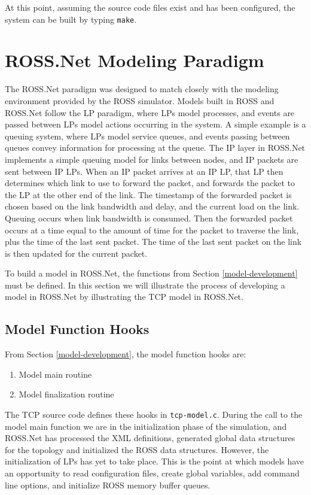 \documentclass[conference,onecolumn]{IEEEtran}
\begin{document}
At this point, assuming the source code files exist and has been configured, the system can be built by typing {\tt make}.

\section{ROSS.Net Modeling Paradigm}
\label{ex-model}

The ROSS.Net paradigm was designed to match closely with the modeling environment provided by the ROSS simulator.  Models built in ROSS and ROSS.Net follow the LP paradigm, where LPs model processes, and events are passed between LPs model actions occurring in the system.  A simple example is a queuing system, where LPs model service queues, and events passing between queues convey information for processing at the queue.  The IP layer in ROSS.Net implements a simple queuing model for links between nodes, and IP packets are sent between IP LPs.  When an IP packet arrives at an IP LP, that LP then determines which link to use to forward the packet, and forwards the packet to the LP at the other end of the link.  The timestamp of the forwarded packet is chosen based on the link bandwidth and delay, and the current load on the link.  Queuing occurs when link bandwidth is consumed.  Then the forwarded packet occurs at a time equal to the amount of time for the packet to traverse the link, plus the time of the last sent packet.  The time of the last sent packet on the link is then updated for the current packet.

To build a model in ROSS.Net, the functions from Section \ref{model-development} must be defined.  In this section we will illustrate the process of developing a model in ROSS.Net by illustrating the TCP model in ROSS.Net.

\subsection{Model Function Hooks}

From Section \ref{model-development}, the model function hooks are:

\begin{enumerate}
  \item Model main routine
  \item Model finalization routine
\end{enumerate}

The TCP source code defines these hooks in {\tt tcp-model.c}.  During the call to the model main function we are in the initialization phase of the simulation, and ROSS.Net has processed the XML definitions, generated global data structures for the topology and initialized the ROSS data structures.  However, the initialization of LPs has yet to take place.  This is the point at which models have an opportunity to read configuration files, create global variables, add command line options, and initialize ROSS memory buffer queues.
\end{document}
